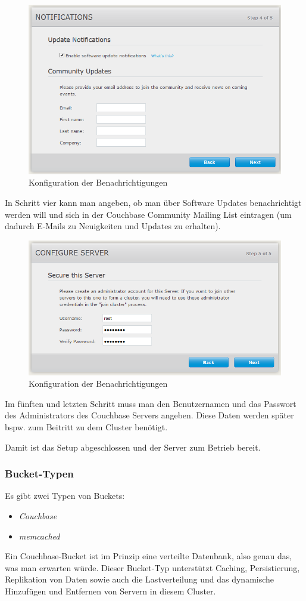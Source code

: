 \begin{figure}[!h]
	\begin{center}
		\includegraphics[width=0.7\linewidth]{images/init-config-4.png}
		\caption{Konfiguration der Benachrichtigungen}
	\end{center}
\end{figure}

In Schritt vier kann man angeben, ob man über Software Updates benachrichtigt werden will und sich in der Couchbase Community Mailing List eintragen (um dadurch E-Mails zu Neuigkeiten und Updates zu erhalten).

\begin{figure}[!h]
	\begin{center}
		\includegraphics[width=0.7\linewidth]{images/init-config-5.png}
		\caption{Konfiguration der Benachrichtigungen}
	\end{center}
\end{figure}
\pagebreak
Im fünften und letzten Schritt muss man den Benutzernamen und das Passwort des Administrators des Couchbase Servers angeben. Diese Daten werden später bspw. zum Beitritt zu dem Cluster benötigt.

Damit ist das Setup abgeschlossen und der Server zum Betrieb bereit.

\subsubsection{Bucket-Typen}
\label{bucket-types}
Es gibt zwei Typen von Buckets:
\begin{itemize}
	\item \textit{Couchbase}
	\item \textit{memcached}
\end{itemize}
Ein Couchbase-Bucket ist im Prinzip eine verteilte Datenbank, also genau das, was man erwarten würde. Dieser Bucket-Typ unterstützt Caching, Persistierung, Replikation von Daten sowie auch die Lastverteilung und das dynamische Hinzufügen und Entfernen von Servern in diesem Cluster.

